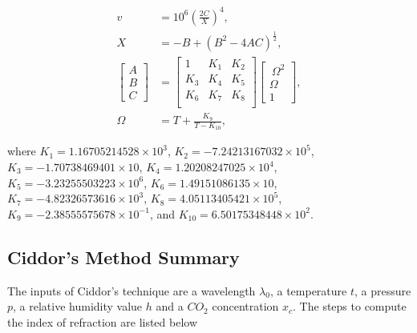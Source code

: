 \begin{align}
\label{eq:huang_v}
v &= 10^{6} \left( \frac{2C}{X} \right)^4, \\
X &= -B + \left( B^2 - 4AC \right)^{\frac{1}{2}}, \\
\begin{bmatrix}
A \\
B \\
C
\end{bmatrix} &=
\begin{bmatrix}
1 & K_1 & K_2 \\
K_3 & K_4 & K_5 \\
K_6 & K_7 & K_8 \\
\end{bmatrix} 
\begin{bmatrix}
~\Omega^2 \\
\Omega \\
1
\end{bmatrix}, \\
\Omega &= T + \frac{K_9}{T - K_{10}},
\end{align}

where $K_1 = 1.16705214528 \times 10^{3}$, $K_2 = -7.24213167032 \times 10^{5}$, $K_3 = -1.70738469401 \times 10$, $K_4 = 1.20208247025 \times 10^{4}$, $K_5 = -3.23255503223 \times 10^{6}$, $K_6 = 1.49151086135 \times 10$, $K_7 = -4.82326573616 \times 10^{3}$, $K_8 = 4.05113405421 \times 10^{5}$, $K_9 = -2.38555575678 \times 10^{-1}$, and $K_{10} = 6.50175348448 \times 10^{2}$.

\subsection{Ciddor's Method Summary}

The inputs of Ciddor's technique are a wavelength $\lambda_0$, a temperature $t$, a pressure $p$, a relative humidity value $h$ and a $CO_2$ concentration $x_c$.
The steps to compute the index of refraction are listed below

